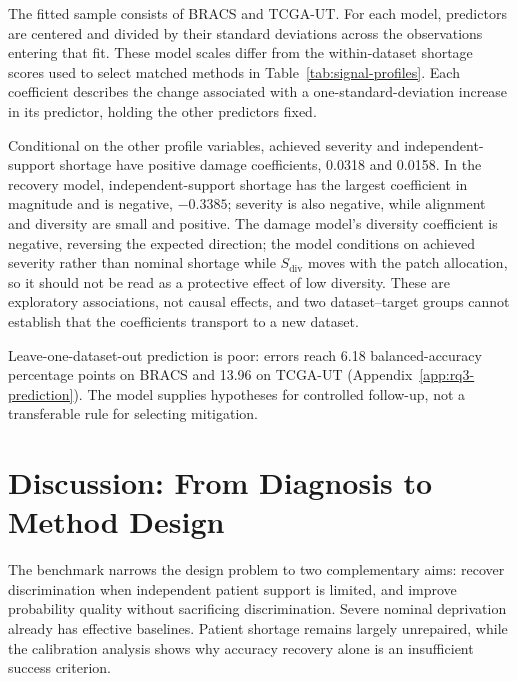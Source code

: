 \documentclass[11pt]{article}
\newcommand{\resultstable}[1]{}
\begin{document}
The fitted sample consists of BRACS and TCGA-UT. For each model, predictors are centered and divided by their standard deviations across the observations entering that fit. These model scales differ from the within-dataset shortage scores used to select matched methods in Table~\ref{tab:signal-profiles}. Each coefficient describes the change associated with a one-standard-deviation increase in its predictor, holding the other predictors fixed.

\begin{table}[ht]
  \centering
  \scriptsize
  \resultstable{rq3_models}
  \caption{Maximum a posteriori estimates for the two exploratory association models fitted to BRACS and TCGA-UT. Damage is signed balanced-accuracy loss and recovery is the recovered fraction. Predictors are standardized within each model's fitted sample.}
  \label{tab:rq3-models}
\end{table}

\noindent Conditional on the other profile variables, achieved severity and independent-support shortage have positive damage coefficients, \num{0.0318} and \num{0.0158}. In the recovery model, independent-support shortage has the largest coefficient in magnitude and is negative, $-\num{0.3385}$; severity is also negative, while alignment and diversity are small and positive. The damage model's diversity coefficient is negative, reversing the expected direction; the model conditions on achieved severity rather than nominal shortage while $S_{\mathrm{div}}$ moves with the patch allocation, so it should not be read as a protective effect of low diversity. These are exploratory associations, not causal effects, and two dataset--target groups cannot establish that the coefficients transport to a new dataset.

Leave-one-dataset-out prediction is poor: errors reach \num{6.18} balanced-accuracy percentage points on BRACS and \num{13.96} on TCGA-UT (Appendix~\ref{app:rq3-prediction}). The model supplies hypotheses for controlled follow-up, not a transferable rule for selecting mitigation.

\section{Discussion: From Diagnosis to Method Design}
\label{sec:discussion}
The benchmark narrows the design problem to two complementary aims: recover discrimination when independent patient support is limited, and improve probability quality without sacrificing discrimination. Severe nominal deprivation already has effective baselines. Patient shortage remains largely unrepaired, while the calibration analysis shows why accuracy recovery alone is an insufficient success criterion.
\end{document}
